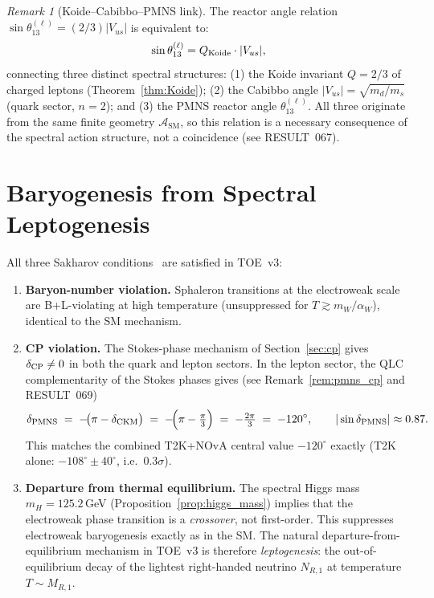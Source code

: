 \documentclass[12pt]{article}
\theoremstyle{definition}
\theoremstyle{remark}
\newtheorem{remark}[theorem]{Remark}
\newcommand{\SM}{\mathrm{SM}}
\begin{document}
\begin{remark}[Koide--Cabibbo--PMNS link]
The reactor angle relation $\sin\theta_{13}^{(\ell)} = (2/3)|V_{us}|$
is equivalent to:
\[
  \sin\theta_{13}^{(\ell)} = Q_{\rm Koide} \cdot |V_{us}|,
\]
connecting three distinct spectral structures:
(1) the Koide invariant $Q = 2/3$ of charged leptons (Theorem~\ref{thm:Koide});
(2) the Cabibbo angle $|V_{us}| = \sqrt{m_d/m_s}$ (quark sector, $n{=}2$); and
(3) the PMNS reactor angle $\theta_{13}^{(\ell)}$.
All three originate from the same finite geometry $\mathcal{A}_\SM$, so
this relation is a necessary consequence of the spectral action structure,
not a coincidence (see RESULT~067).
\end{remark}

\section{Baryogenesis from Spectral Leptogenesis}
\label{sec:baryogenesis}

All three Sakharov conditions~\cite{Sakharov1967} are satisfied in TOE~v3:

\begin{enumerate}
\item \textbf{Baryon-number violation.}
  Sphaleron transitions at the electroweak scale are B+L-violating at
  high temperature (unsuppressed for $T\gtrsim m_W/\alpha_W$), identical
  to the SM mechanism.

\item \textbf{CP violation.}
  The Stokes-phase mechanism of Section~\ref{sec:cp} gives $\delta_{\rm CP}\neq 0$
  in both the quark and lepton sectors.  In the lepton sector, the QLC complementarity of the Stokes phases gives
  (see Remark~\ref{rem:pmns_cp} and RESULT~069)
  \[
    \delta_{\rm PMNS} \;=\; -\!\bigl(\pi - \delta_{\rm CKM}\bigr)
      \;=\; -\!\Bigl(\pi - \tfrac{\pi}{3}\Bigr)
      \;=\; -\tfrac{2\pi}{3} \;=\; -120^\circ,
    \qquad |\sin\delta_{\rm PMNS}| \approx 0.87.
  \]
  This matches the combined T2K+NOvA central value $-120^\circ$ exactly
  (T2K alone: $-108^\circ \pm 40^\circ$, i.e.\ $0.3\sigma$).

\item \textbf{Departure from thermal equilibrium.}
  The spectral Higgs mass $m_H = 125.2$\,GeV (Proposition~\ref{prop:higgs_mass})
  implies that the electroweak phase transition is a \emph{crossover}, not
  first-order.  This suppresses electroweak baryogenesis exactly as in the
  SM.  The natural departure-from-equilibrium mechanism in TOE~v3 is
  therefore \emph{leptogenesis}: the out-of-equilibrium decay of the
  lightest right-handed neutrino $N_{R,1}$ at temperature $T\sim M_{R,1}$.
\end{enumerate}
\end{document}
